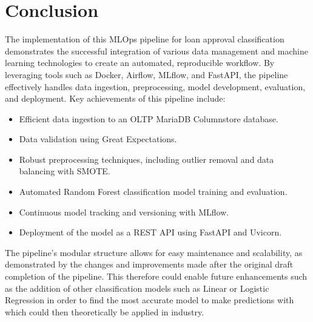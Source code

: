 \documentclass[12pt]{report}
\begin{document}
\chapter*{Conclusion}

The implementation of this MLOps pipeline for loan approval classification demonstrates the successful integration of various
data management and machine learning technologies to create an automated, reproducible workflow. By leveraging tools such as Docker,
Airflow, MLflow, and FastAPI, the pipeline effectively handles data ingestion, preprocessing, model development, evaluation, and 
deployment. Key achievements of this pipeline include:

\begin{itemize}
    \item Efficient data ingestion to an OLTP MariaDB Columnstore database.
    \item Data validation using Great Expectations.
    \item Robust preprocessing techniques, including outlier removal and data balancing with SMOTE.
    \item Automated Random Forest classification model training and evaluation.
    \item Continuous model tracking and versioning with MLflow.
    \item Deployment of the model as a REST API using FastAPI and Uvicorn.
\end{itemize}

\noindent The pipeline's modular structure allows for easy maintenance and scalability, as demonstrated by the changes and improvements 
made after the original draft completion of the pipeline. This therefore could enable future enhancements such as the addition 
of other classification models such as Linear or Logistic Regression in order to find the most accurate model to make predictions with 
which could then theoretically be applied in industry.
   



% 








\printbibliography
\end{document}

